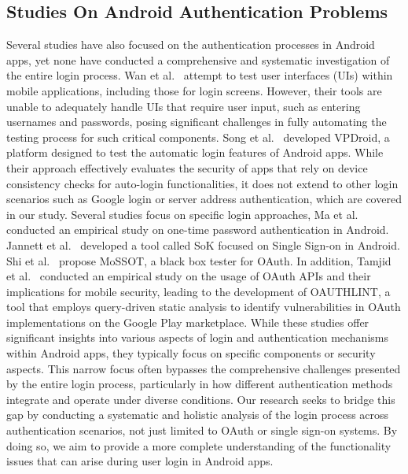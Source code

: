 \subsection{Studies On Android Authentication Problems}
Several studies have also focused on the authentication processes in Android apps, yet none have conducted a comprehensive and systematic investigation of the entire login process.
Wan et al.~\cite{8919059} attempt to test user interfaces (UIs) within mobile applications, including those for login screens. However, their tools are unable to adequately handle UIs that require user input, such as entering usernames and passwords, posing significant challenges in fully automating the testing process for such critical components. Song et al.~\cite{9401988} developed VPDroid, a platform designed to test the automatic login features of Android apps. While their approach effectively evaluates the security of apps that rely on device consistency checks for auto-login functionalities, it does not extend to other login scenarios such as Google login or server address authentication, which are covered in our study. Several studies focus on specific login approaches, Ma et al.~\cite{10.1145/3359789.3359828} conducted an empirical study on one-time password authentication in Android.  Jannett et al.~\cite{10628996} developed a tool called SoK focused on Single Sign-on in Android. Shi et al.~\cite{10.1145/3321705.3329801} propose MoSSOT, a black box tester for OAuth. In addition, Tamjid et al.~\cite{8952200} conducted an empirical study on the usage of OAuth APIs and their implications for mobile security, leading to the development of OAUTHLINT, a tool that employs query-driven static analysis to identify vulnerabilities in OAuth implementations on the Google Play marketplace. While these studies offer significant insights into various aspects of login and authentication mechanisms within Android apps, they typically focus on specific components or security aspects. This narrow focus often bypasses the comprehensive challenges presented by the entire login process, particularly in how different authentication methods integrate and operate under diverse conditions. Our research seeks to bridge this gap by conducting a systematic and holistic analysis of the login process across authentication scenarios, not just limited to OAuth or single sign-on systems. By doing so, we aim to provide a more complete understanding of the functionality issues that can arise during user login in Android apps.  